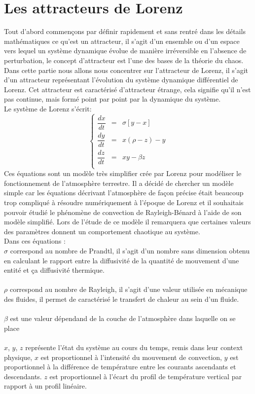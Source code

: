 \chapter{Les attracteurs de Lorenz}
Tout d’abord commençons par définir rapidement et sans rentré dans les détails mathématiques ce qu’est un attracteur,
 il s’agit d’un ensemble ou d’un espace vers lequel un système dynamique évolue de manière
 irréversible en l’absence de perturbation, le concept d’attracteur est l’une des bases de la théorie du chaos. 
 Dans cette partie nous allons nous concentrer sur l’attracteur de Lorenz, il s’agit d’un attracteur
représentant l’évolution du système dynamique différentiel de Lorenz. Cet attracteur est caractérisé d'attracteur étrange, cela signifie qu'il n'est pas continue, mais formé point par point par la dynamique du système.\\

Le système de Lorenz s'écrit: 
\[
    \left\{
    \begin{array}{rcl}
        \dfrac{dx}{dt}&=&\sigma[y-x]\\
        \dfrac{dy}{dt}&=&x(\rho-z)-y\\
        \dfrac{dz}{dt}&=&xy-\beta z\\
    \end{array}
    \right.
\]
Ces équations sont un modèle très simplifier crée par Lorenz pour modéliser le fonctionnement 
de l’atmosphère terrestre. Il a décidé de chercher un modèle simple car 
les équations décrivant l’atmosphère de façon précise était beaucoup trop compliqué à résoudre
 numériquement à l’époque de Lorenz et il souhaitais pouvoir étudié  le phénomène de convection
de Rayleigh-Bénard à l’aide de son modèle simplifié. Lors de l'étude de ce modèle il remarquera que certaines valeurs des paramètres donnent un comportement
chaotique au système.\\

Dans ces équations : \\
$\sigma$  correspond au nombre de Prandtl, il s'agit d'un nombre sans dimension obtenu en calculant le rapport entre la diffusivité de la quantité de mouvement d'une entité et ça diffusivité thermique.\\\\
$\rho$    correspond au nombre de Rayleigh, il s'agit d’une valeur utilisée en mécanique des fluides, il permet de caractérisé le transfert de chaleur au sein d'un fluide. \\\\
$\beta $  est une valeur dépendand de la couche de l'atmosphère dans laquelle on se place\\\\
$x$, $y$, $z$ représente l'état du système au cours du temps, remis dans leur context physique, $x$ est proportionnel à l'intensité du mouvement de convection, $y$ est proportionnel à la différence de température entre les courants ascendants et descendants. $z$ est proportionnel à l'écart du profil de température vertical par rapport à un profil linéaire.    

